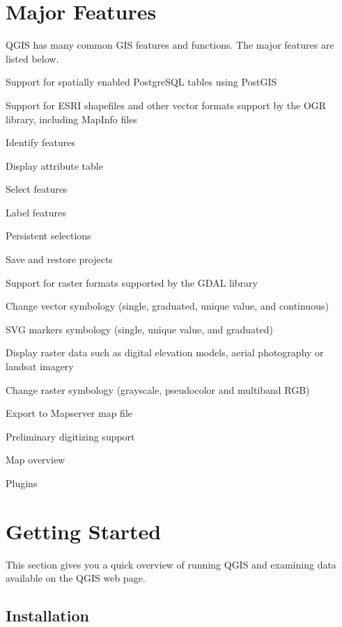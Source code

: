 \documentclass[10pt,english]{article}
\begin{document}
\begin{onehalfspace}
\section{Major Features}

QGIS has many common GIS features and functions. The major features
are listed below. 

\begin{compactenum}
\item Support for spatially enabled PostgreSQL tables using PostGIS 
\item Support for ESRI shapefiles and other vector formats support by the
OGR library, including MapInfo files 
\item Identify features 
\item Display attribute table 
\item Select features 
\item Label features
\item Persistent selections 
\item Save and restore projects
\item Support for raster formats supported by the GDAL library 
\item Change vector symbology (single, graduated, unique value, and continuous) 
\item SVG markers symbology (single, unique value, and graduated) 
\item Display raster data such as digital elevation models, aerial photography
or landsat imagery 
\item Change raster symbology (grayscale, pseudocolor and multiband RGB) 
\item Export to Mapserver map file 
\item Preliminary digitizing support
\item Map overview
\item Plugins 
\end{compactenum}

\section{Getting Started}

This section gives you a quick overview of running QGIS and examining
data available on the QGIS web page.


\subsection{Installation}


\end{onehalfspace}
\end{document}
